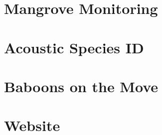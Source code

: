 \section{Mangrove Monitoring}

\section{Acoustic Species ID}

\section{Baboons on the Move}

\section{Website}

